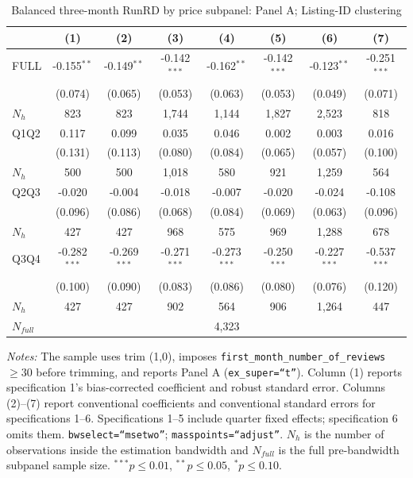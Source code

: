 \begin{table}[!htbp]
\centering
\caption{Balanced three-month RunRD by price subpanel: Panel A; Listing-ID clustering}
\scriptsize
\setlength{\tabcolsep}{5pt}
\begin{tabular}{l*{7}{c}}
\toprule
 & (1) & (2) & (3) & (4) & (5) & (6) & (7) \\
\midrule
FULL & -0.155$^{**}$ & -0.149$^{**}$ & -0.142$^{***}$ & -0.162$^{**}$ & -0.142$^{***}$ & -0.123$^{**}$ & -0.251$^{***}$ \\
 & (0.074) & (0.065) & (0.053) & (0.063) & (0.053) & (0.049) & (0.071) \\
$N_h$ & 823 & 823 & 1,744 & 1,144 & 1,827 & 2,523 & 818 \\
\addlinespace
Q1Q2 & 0.117 & 0.099 & 0.035 & 0.046 & 0.002 & 0.003 & 0.016 \\
 & (0.131) & (0.113) & (0.080) & (0.084) & (0.065) & (0.057) & (0.100) \\
$N_h$ & 500 & 500 & 1,018 & 580 & 921 & 1,259 & 564 \\
\addlinespace
Q2Q3 & -0.020 & -0.004 & -0.018 & -0.007 & -0.020 & -0.024 & -0.108 \\
 & (0.096) & (0.086) & (0.068) & (0.084) & (0.069) & (0.063) & (0.096) \\
$N_h$ & 427 & 427 & 968 & 575 & 969 & 1,288 & 678 \\
\addlinespace
Q3Q4 & -0.282$^{***}$ & -0.269$^{***}$ & -0.271$^{***}$ & -0.273$^{***}$ & -0.250$^{***}$ & -0.227$^{***}$ & -0.537$^{***}$ \\
 & (0.100) & (0.090) & (0.083) & (0.086) & (0.080) & (0.076) & (0.120) \\
$N_h$ & 427 & 427 & 902 & 564 & 906 & 1,264 & 447 \\

\midrule
$N_{full}$ & \multicolumn{7}{c}{4,323} \\
\bottomrule
\end{tabular}
\begin{minipage}{0.98\textwidth}
\footnotesize
\textit{Notes:} The sample uses trim (1,0), imposes \texttt{first\_month\_number\_of\_reviews}$\geq30$ before trimming, and reports Panel A (\texttt{ex\_super=``t''}). Column (1) reports specification 1's bias-corrected coefficient and robust standard error. Columns (2)--(7) report conventional coefficients and conventional standard errors for specifications 1--6. Specifications 1--5 include quarter fixed effects; specification 6 omits them. \texttt{bwselect=``msetwo''}; \texttt{masspoints=``adjust''}. $N_h$ is the number of observations inside the estimation bandwidth and $N_{full}$ is the full pre-bandwidth subpanel sample size. $^{***}p\leq0.01$, $^{**}p\leq0.05$, $^{*}p\leq0.10$.
\end{minipage}
\end{table}
\clearpage

